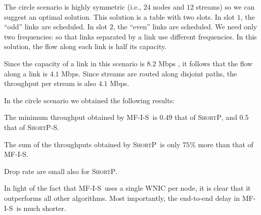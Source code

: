 \documentclass[11pt]{article}
\newenvironment{proof sketch}[1]{\noindent {\emph{Proof sketch of #1:}}}{\hfill \qed}
\newcommand{\algA}{\textsc{MF-I-S}}
\newcommand{\algB}{\textsc{ShortP}}
\newcommand{\algBS}{\textsc{ShortP-S}}
\begin{document}
The circle scenario is highly symmetric (i.e., $24$ nodes and $12$
streams) so we can suggest an optimal solution.  This solution is a
table with two slots.  In slot $1$, the ``odd'' links are scheduled.
In slot $2$, the ``even'' links are scheduled.  We need only two
frequencies: so that links separated by a link use different
frequencies.  In this solution, the flow along each link is half its
capacity.

Since the capacity of a link in this scenario is $8.2$ Mbps , it
follows that the flow along a link is $4.1$ Mbps. Since streams are
routed along disjoint paths, the throughput per stream is also $4.1$
Mbps.

In the circle scenario we obtained the following results:
\begin{inparaenum}[(1)]%
\item The minimum throughput obtained by \algA\ is $0.49$ that of
  \algB, and $0.5$ that of \algBS.
\item The sum of the throughputs obtained by \algB\ is only $75$\%
  more than that of \algA.
\item Drop rate are small also for \algB.
\end{inparaenum}%

In light of the fact that \algA\ uses a single WNIC per node, it is
clear that it outperforms all other algorithms. Most importantly, the
end-to-end delay in \algA\ is much shorter.

% 
\end{document}
